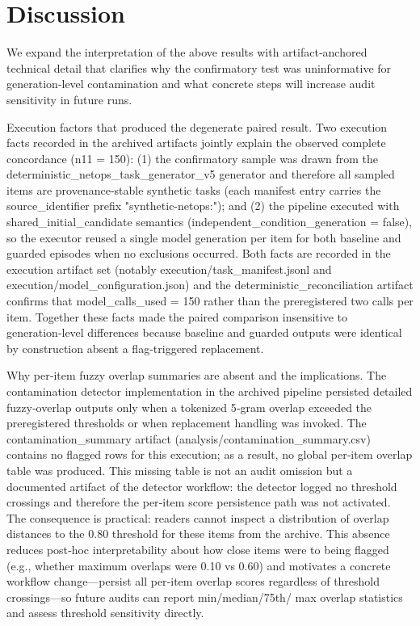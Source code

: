 \documentclass[conference]{IEEEtran}
\begin{document}
\section{Discussion}
We expand the interpretation of the above results with artifact‑anchored technical detail that clarifies why the confirmatory test was uninformative for generation‑level contamination and what concrete steps will increase audit sensitivity in future runs.

Execution factors that produced the degenerate paired result. Two execution facts recorded in the archived artifacts jointly explain the observed complete concordance (n11 = 150): (1) the confirmatory sample was drawn from the deterministic\_netops\_task\_generator\_v5 generator and therefore all sampled items are provenance‑stable synthetic tasks (each manifest entry carries the source\_identifier prefix "synthetic-netops:"); and (2) the pipeline executed with shared\_initial\_candidate semantics (independent\_condition\_generation = false), so the executor reused a single model generation per item for both baseline and guarded episodes when no exclusions occurred. Both facts are recorded in the execution artifact set (notably execution/task\_manifest.jsonl and execution/model\_configuration.json) and the deterministic\_reconciliation artifact confirms that model\_calls\_used = 150 rather than the preregistered two calls per item. Together these facts made the paired comparison insensitive to generation‑level differences because baseline and guarded outputs were identical by construction absent a flag-triggered replacement.

Why per‑item fuzzy overlap summaries are absent and the implications. The contamination detector implementation in the archived pipeline persisted detailed fuzzy‑overlap outputs only when a tokenized 5‑gram overlap exceeded the preregistered thresholds or when replacement handling was invoked. The contamination\_summary artifact (analysis/contamination\_summary.csv) contains no flagged rows for this execution; as a result, no global per‑item overlap table was produced. This missing table is not an audit omission but a documented artifact of the detector workflow: the detector logged no threshold crossings and therefore the per‑item score persistence path was not activated. The consequence is practical: readers cannot inspect a distribution of overlap distances to the 0.80 threshold for these items from the archive. This absence reduces post‑hoc interpretability about how close items were to being flagged (e.g., whether maximum overlaps were 0.10 vs 0.60) and motivates a concrete workflow change---persist all per‑item overlap scores regardless of threshold crossings---so future audits can report min/median/75th/ max overlap statistics and assess threshold sensitivity directly.
\end{document}
